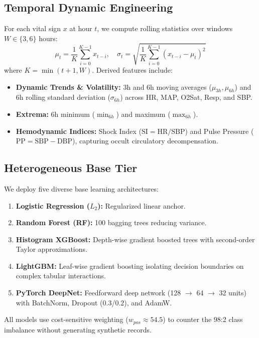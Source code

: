 \documentclass[conference]{IEEEtran}
\begin{document}
\subsection{Temporal Dynamic Engineering}
For each vital sign $x$ at hour $t$, we compute rolling statistics over windows $W \in \{3, 6\}$ hours:
\begin{equation}
\mu_t = \frac{1}{K}\sum_{i=0}^{K-1} x_{t-i}, \quad \sigma_t = \sqrt{\frac{1}{K}\sum_{i=0}^{K-1} (x_{t-i} - \mu_t)^2}
\end{equation}
where $K = \min(t+1, W)$. Derived features include:
\begin{itemize}
    \item \textbf{Dynamic Trends \& Volatility:} 3h and 6h moving averages ($\mu_{3h}, \mu_{6h}$) and 6h rolling standard deviation ($\sigma_{6h}$) across HR, MAP, O2Sat, Resp, and SBP.
    \item \textbf{Extrema:} 6h minimum ($\min_{6h}$) and maximum ($\max_{6h}$).
    \item \textbf{Hemodynamic Indices:} Shock Index ($\text{SI} = \text{HR} / \text{SBP}$) and Pulse Pressure ($\text{PP} = \text{SBP} - \text{DBP}$), capturing occult circulatory decompensation.
\end{itemize}

\subsection{Heterogeneous Base Tier}
We deploy five diverse base learning architectures:
\begin{enumerate}
    \item \textbf{Logistic Regression ($L_2$):} Regularized linear anchor.
    \item \textbf{Random Forest (RF):} 100 bagging trees reducing variance.
    \item \textbf{Histogram XGBoost:} Depth-wise gradient boosted trees with second-order Taylor approximations.
    \item \textbf{LightGBM:} Leaf-wise gradient boosting isolating decision boundaries on complex tabular interactions.
    \item \textbf{PyTorch DeepNet:} Feedforward deep network (128 $\to$ 64 $\to$ 32 units) with BatchNorm, Dropout (0.3/0.2), and AdamW.
\end{enumerate}
All models use cost-sensitive weighting ($w_{pos} \approx 54.5$) to counter the 98:2 class imbalance without generating synthetic records.
\end{document}

